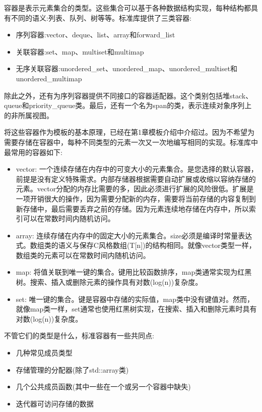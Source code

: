 容器是表示元素集合的类型。这些集合可以基于各种数据结构实现，每种结构都具有不同的语义:列表、队列、树等等。标准库提供了三类容器:

\begin{itemize}
\item
序列容器:vector、deque、list、array和forward\_list

\item
关联容器:set、map、multiset和multimap

\item
无序关联容器:unordered\_set、unordered\_map、unordered\_multiset和unordered\_multimap
\end{itemize}

除此之外，还有为序列容器提供不同接口的容器适配器。这个类别包括堆stack、queue和priority\_queue类。最后，还有一个名为span的类，表示连续对象序列上的非所属视图。

将这些容器作为模板的基本原理，已经在第1章模板介绍中介绍过。因为不希望为需要存储在容器中，每种不同类型的元素一次又一次地编写相同的实现。标准库中最常用的容器如下:

\begin{itemize}
\item
vector: 一个连续存储在内存中的可变大小的元素集合。是您选择的默认容器，前提是没有定义特殊需求。内部存储器根据需要自动扩展或收缩以容纳存储的元素。vector分配的内存比需要的多，因此必须进行扩展的风险很低。扩展是一项开销很大的操作，因为需要分配新的内存，需要将当前存储的内容复制到新存储中，最后需要丢弃之前的存储。因为元素连续地存储在内存中，所以索引可以在常数时间内随机访问。

\item
array: 连续存储在内存中的固定大小的元素集合。size必须是编译时常量表达式。数组类的语义与保存C风格数组(T[n])的结构相同。就像vector类型一样，数组类的元素可以在常数时间内随机访问。

\item
map: 将值关联到唯一键的集合。键用比较函数排序，map类通常实现为红黑树。搜索、插入或删除元素的操作具有对数(log(n))复杂度。

\item
set: 唯一键的集合。键是容器中存储的实际值，map类中没有键值对。然而，就像map类一样，set通常也使用红黑树实现，在搜索、插入和删除元素时具有对数(log(n))复杂度。
\end{itemize}

不管它们的类型是什么，标准容器有一些共同点:

\begin{itemize}
\item
几种常见成员类型

\item
存储管理的分配器(除了std::array类)

\item
几个公共成员函数(其中一些在一个或另一个容器中缺失)

\item
迭代器可访问存储的数据
\end{itemize}

